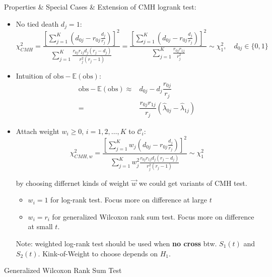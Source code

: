 Properties \& Special Cases \& Extension of CMH logrank test:
\begin{itemize}[topsep=2pt,itemsep=0pt]
    \item No tied death $ d_j=1 $:
    \begin{equation}\label{EqaCMHTest}
        \chi^2 _{CMH}=\dfrac{\left[ \sum_{j=1}^K (d_{0j}-r_{0j}\frac{d_j}{r_j}) \right]^2 }{\sum_{j=1}^K \frac{r_{0j}r_{1j}d_j(r_j-d_j)}{r_j^2(r_j-1)}}= \dfrac{\left[ \sum_{j=1}^K (d_{0j}-r_{0j}\frac{d_j}{r_j}) \right]^2 }{\sum_{j=1}^K \frac{r_{0j}r_{1j}}{r_j^2}} \sim \chi^2_1,\quad d_{0j}\in\{0,1\}
    \end{equation}
    \item Intuition of $ \mathrm{obs}-\mathbb{E}\left( \mathrm{obs}  \right)   $:
    \begin{align}
        \mathrm{obs}-\mathbb{E}\left( \mathrm{obs}  \right) \approx& d_{0j}-d_j\dfrac{r_{0j}}{r_{j}}\\
        =&\dfrac{r_{0j}r_{1j}}{r_j}\left(\hat{\lambda }_{0j}-\hat{\lambda }_{1j}\right)
    \end{align}
    \item Attach weight $ w_i\geq 0 $, $ i=1,2,\ldots ,K $ to $ \mathcal{C}_i $:
    \begin{equation}
        \chi^2_{CMH,w}=\dfrac{\left[ \sum_{j=1}^K w_j(d_{0j}-r_{0j}\frac{d_j}{r_j}) \right]^2 }{\sum_{j=1}^K w_j^2\frac{r_{0j}r_{1j}d_j(r_j-d_j)}{r_j^2(r_j-1)}}\sim \chi^2_1
    \end{equation}
    
    by choosing differnet kinds of weight $ \vec{w} $ we could get variants of CMH test.
    \begin{itemize}[topsep=2pt,itemsep=0pt]
        \item $ w_i=1 $ for log-rank test. Focus more on difference at large $ t $
        \item $ w_i=r_i $ for generalized Wilcoxon rank sum test.  Focus more on difference at small $ t $.
    \end{itemize}
    
    Note: weighted log-rank test should be used when \textbf{no cross}  btw. $ S_1(t) $ and $ S_2(t) $. Kink-of-Weight to choose depends on $ H_1 $.
        
    
\end{itemize}



\begin{point}
    Generalized Wilcoxon Rank Sum Test
\end{point}

